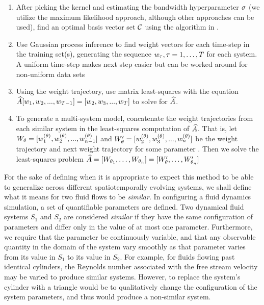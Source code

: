 \begin{enumerate}
	\item After picking the kernel and estimating the bandwidth hyperparameter $\sigma$ (we utilize the maximum likelihood approach, although other approaches can be used), find an optimal basis vector set $\mathcal{C}$ using the algorithm in \cite{csato2002sparse}.
	\item Use Gaussian process inference to find weight vectors for each time-step in the training set(s), generating the sequence $w_\tau, \tau=1,\dots,T$ for each system. A uniform time-step makes next step easier but can be worked around for non-uniform data sets
	\item Using the weight trajectory, use matrix least-squares with the equation $\widehat{A} [w_1,w_2, ...,w_{T-1}] = [w_2,w_3,...,w_T]$ to solve for $\widehat{A}$.
	\item To generate a multi-system model, concatenate the weight trajectories from each similar system in the least-squares computation of $\widehat{A}$. That is, let $W_{\theta} = [w_1^{(\theta)},w_2^{(\theta)}, ...,w_{n-1}^{(\theta)}]$ and $W_{\theta}' = [w_2^{(\theta)},w_3^{(\theta)}, ...,w_n^{(\theta)}]$ be the weight trajectory and next weight trajectory for some parameter . Then we solve the least-squares problem $\widehat{A} = [W_{\theta_1},\dots,W_{\theta_n}] = [W_{\theta}',\dots,W_{\theta_n}']$
\end{enumerate}

For the sake of defining when it is appropriate to expect this method to be able to generalize across different spatiotemporally evolving systems, we shall define what it means for two fluid flows to be \emph{similar}. In configuring a fluid dynamics simulation, a set of quantifiable parameters are defined. Two dynamical fluid systems $S_1$ and $S_2$ are considered \emph{similar} if they have  the same configuration of parameters and differ only in the value of at most one parameter. Furthermore, we require that the parameter be continuously variable, and that any observable quantity in the domain of the system vary smoothly as that parameter varies from its value in $S_1$ to its value in $S_2$. For example, for fluids flowing past identical cylinders, the Reynolds number associated with the free stream velocity may be varied to produce similar systems. However, to replace the system's cylinder with a triangle would be to qualitatively change the configuration of the system parameters, and thus would produce a non-similar system.

